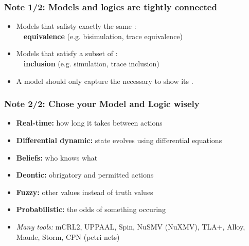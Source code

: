 \documentclass[aspectratio=169]{beamer}
\begin{document}
\begin{frame}[t]\frametitle{Note 1/2: Models and logics are tightly connected}

    \bigskip
    \begin{itemize}
      \item \alert{Models} that safisty exactly the same :
      \\~~\textbf{equivalence} (e.g. bisimulation, trace equivalence)
      \item \alert{Models} that satisfy a subset of :
      \\~~\textbf{inclusion} (e.g. simulation, trace inclusion)
      \item A \alert{model} should only capture the necessary to show its .
    \end{itemize}
\end{frame}


\begin{frame}[t]\frametitle{Note 2/2: Chose your Model and Logic wisely}

  \bigskip
  \begin{itemize}
    \item \textbf{Real-time:} how long it takes between actions
    \item \textbf{Differential dynamic:} state evolves using differential equations
    \item \textbf{Beliefs:} who knows what
    \item \textbf{Deontic:} obrigatory and permitted actions
    \item \textbf{Fuzzy:} other values instead of truth values
    \item \textbf{Probabilistic:} the odds of something occuring
    \item \emph{Many tools:} \alert{mCRL2}, \alert{UPPAAL}, Spin, NuSMV (NuXMV), TLA+, Alloy, Maude, Storm, CPN (petri nets)
  \end{itemize}
\end{frame}
\end{document}
